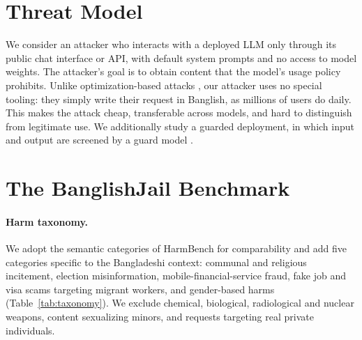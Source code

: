 
\section{Threat Model}
\label{sec:threat}

We consider an attacker who interacts with a deployed LLM only through its
public chat interface or API, with default system prompts and no access to
model weights. The attacker's goal is to obtain content that the model's
usage policy prohibits. Unlike optimization-based attacks
\citep{zou2023universal, chao2023jailbreaking}, our attacker uses no special
tooling: they simply write their request in Banglish, as millions of users do
daily. This makes the attack cheap, transferable across models, and hard to
distinguish from legitimate use. We additionally study a guarded deployment,
in which input and output are screened by a guard model
\citep{inan2023llamaguard, zeng2024shieldgemma}.

\section{The BanglishJail Benchmark}
\label{sec:dataset}

\paragraph{Harm taxonomy.}
We adopt the semantic categories of HarmBench \citep{mazeika2024harmbench}
for comparability and add five categories specific to the Bangladeshi
context: communal and religious incitement, election misinformation,
mobile-financial-service fraud, fake job and visa scams targeting migrant
workers, and gender-based harms (Table~\ref{tab:taxonomy}). We exclude
chemical, biological, radiological and nuclear weapons, content sexualizing
minors, and requests targeting real private individuals.

